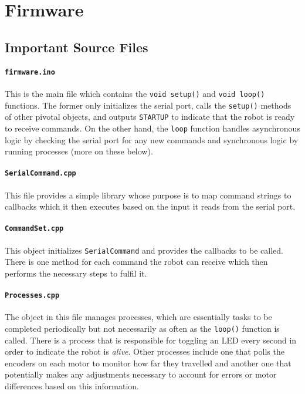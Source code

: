 %
%

\section{Firmware}

\subsection{Important Source Files}

\paragraph{\texttt{firmware.ino}}
This is the main file which contains the \texttt{void setup()} and \texttt{void loop()} functions. The former only initializes the serial port, calls the \texttt{setup()} methods of other pivotal objects, and outputs \texttt{STARTUP} to indicate that the robot is ready to receive commands. On the other hand, the \texttt{loop} function handles asynchronous logic by checking the serial port for any new commands and synchronous logic by running processes (more on these below).

\paragraph{\texttt{SerialCommand.cpp}} This file provides a simple library whose purpose is to map command strings to callbacks which it then executes based on the input it reads from the serial port.

\paragraph{\texttt{CommandSet.cpp}} This object initializes \texttt{SerialCommand} and provides the callbacks to be called. There is one method for each command the robot can receive which then performs the necessary steps to fulfil it.

\paragraph{\texttt{Processes.cpp}} The object in this file manages processes, which are essentially tasks to be completed periodically but not necessarily as often as the \texttt{loop()} function is called. There is a process that is responsible for toggling an LED every second in order to indicate the robot is \textit{alive}. Other processes include one that polls the encoders on each motor to monitor how far they travelled and another one that potentially makes any adjustments necessary to account for errors or motor differences based on this information.

